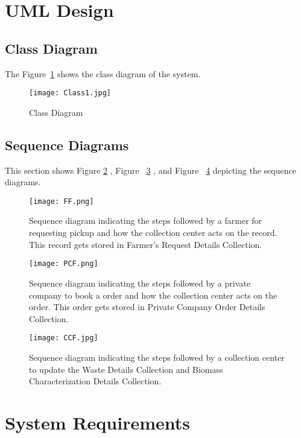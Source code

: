 \documentclass[conference]{IEEEtran}
\begin{document}
\section{UML Design}
\subsection{Class Diagram}
The Figure~\ref{fig:001} shows the class diagram of the system.
\begin{figure}[htbp]
\centerline{\texttt{[image: Class1.jpg]}}
\caption{Class Diagram}
\label{fig:001}
\end{figure}
\subsection{Sequence Diagrams}
This section shows Figure \ref{fig:a} , Figure ~\ref{fig:c} , and Figure ~\ref{fig:b} depicting the sequence diagrams.
\begin{figure}[htbp]
\centerline{\texttt{[image: FF.png]}}
\caption{Sequence diagram indicating the steps followed by a farmer for requesting pickup and how the collection center acts on the record. This record gets stored in Farmer's Request Details Collection. }
\label{fig:a}
\end{figure}
\begin{figure}[htbp]
\centerline{\texttt{[image: PCF.png]}}
\caption{Sequence diagram indicating the steps followed by a private company to book a order and how the collection center acts on the order. This order gets stored in Private Company Order Details Collection. }
\label{fig:c}
\end{figure}
\begin{figure}[htbp]
\centerline{\texttt{[image: CCF.jpg]}}
\caption{Sequence diagram indicating the steps followed by a collection center to update the Waste Details Collection and Biomass Characterization Details Collection. }
\label{fig:b}
\end{figure}

\section{System Requirements}

 
\end{document}
